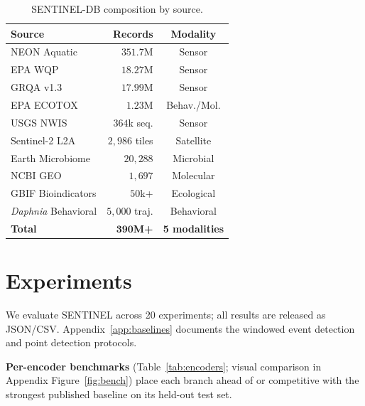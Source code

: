 \documentclass{article}
\begin{document}
\begin{table}[t]
\caption{SENTINEL-DB composition by source.}
\label{tab:db}
\centering
\small
\begin{tabular}{lrc}
\toprule
\textbf{Source} & \textbf{Records} & \textbf{Modality} \\
\midrule
NEON Aquatic & $351.7$M & Sensor \\
EPA WQP & $18.27$M & Sensor \\
GRQA v1.3 & $17.99$M & Sensor \\
EPA ECOTOX & $1.23$M & Behav./Mol. \\
USGS NWIS & $364$k seq. & Sensor \\
Sentinel-2 L2A & $2{,}986$ tiles & Satellite \\
Earth Microbiome & $20{,}288$ & Microbial \\
NCBI GEO & $1{,}697$ & Molecular \\
GBIF Bioindicators & $50$k+ & Ecological \\
\emph{Daphnia} Behavioral & $5{,}000$ traj. & Behavioral \\
\midrule
\textbf{Total} & $\mathbf{390}$\textbf{M+} & \textbf{5 modalities} \\
\bottomrule
\end{tabular}
\end{table}

\section{Experiments}
\label{sec:exp}

We evaluate SENTINEL across 20 experiments; all results are released as JSON/CSV. Appendix~\ref{app:baselines} documents the windowed event detection and point detection protocols.

\textbf{Per-encoder benchmarks} (Table~\ref{tab:encoders}; visual comparison in Appendix Figure~\ref{fig:bench}) place each branch ahead of or competitive with the strongest published baseline on its held-out test set.
\end{document}
